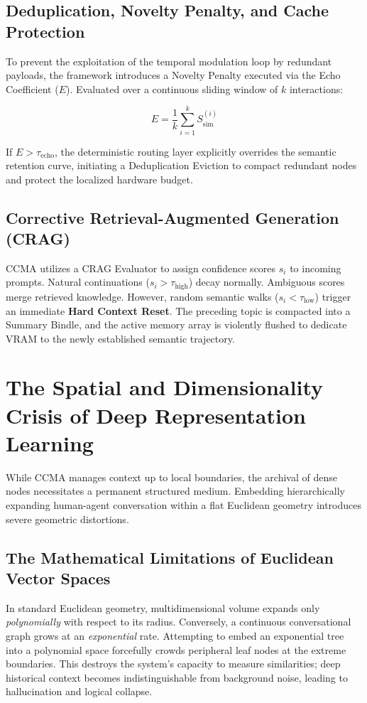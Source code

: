 \documentclass[11pt, a4paper]{article}
\begin{document}
	\subsection{Deduplication, Novelty Penalty, and Cache Protection}
	To prevent the exploitation of the temporal modulation loop by redundant payloads, the framework introduces a Novelty Penalty executed via the Echo Coefficient ($E$). Evaluated over a continuous sliding window of $k$ interactions:
	
	\begin{equation}
		E = \frac{1}{k} \sum_{i=1}^{k} S_{\text{sim}}^{(i)}
	\end{equation}
	
	If $E > \tau_{\text{echo}}$, the deterministic routing layer explicitly overrides the semantic retention curve, initiating a Deduplication Eviction to compact redundant nodes and protect the localized hardware budget.
	
	\subsection{Corrective Retrieval-Augmented Generation (CRAG)}
	CCMA utilizes a CRAG Evaluator to assign confidence scores $s_i$ to incoming prompts. Natural continuations ($s_i > \tau_{\text{high}}$) decay normally. Ambiguous scores merge retrieved knowledge. However, random semantic walks ($s_i < \tau_{\text{low}}$) trigger an immediate \textbf{Hard Context Reset}. The preceding topic is compacted into a Summary Bindle, and the active memory array is violently flushed to dedicate VRAM to the newly established semantic trajectory.
	
	\section{The Spatial and Dimensionality Crisis of Deep Representation Learning}
	While CCMA manages context up to local boundaries, the archival of dense nodes necessitates a permanent structured medium. Embedding hierarchically expanding human-agent conversation within a flat Euclidean geometry introduces severe geometric distortions.
	
	\subsection{The Mathematical Limitations of Euclidean Vector Spaces}
	In standard Euclidean geometry, multidimensional volume expands only \textit{polynomially} with respect to its radius. Conversely, a continuous conversational graph grows at an \textit{exponential} rate. Attempting to embed an exponential tree into a polynomial space forcefully crowds peripheral leaf nodes at the extreme boundaries. This destroys the system's capacity to measure similarities; deep historical context becomes indistinguishable from background noise, leading to hallucination and logical collapse.
	
\end{document}
